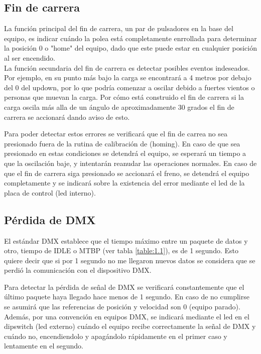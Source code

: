 \subsection{Fin de carrera}
La función principal del fin de carrera, un par de pulsadores en la base del equipo, es indicar cuándo la polea está completamente enrrollada para determinar la posición 0 o "home" del equipo, dado que este puede estar en cualquier posición al ser encendido.\\
La función secundaria del fin de carrera es detectar posibles eventos indeseados. Por ejemplo, en su punto más bajo la carga se encontrará a 4 metros por debajo del 0 del updown, por lo que podría comenzar a oscilar debido a fuertes vientos o personas que muevan la carga. Por cómo está construido el fin de carrera si la carga oscila más alla de un ángulo de aproximadamente 30 grados el fin de carrera se accionará dando aviso de esto.

Para poder detectar estos errores se verificará que el fin de carrea no sea presionado fuera de la rutina de calibración de (homing). En caso de que sea presionado en estas condiciones se detendrá el equipo, se esperará un tiempo a que la oscilación baje, y intentarán reanudar las operaciones normales. En caso de que el fin de carrera siga presionado se accionará el freno, se detendrá el equipo completamente y se indicará sobre la existencia del error mediante el led de la placa de control (led interno).


\subsection{Pérdida de DMX}
El estándar DMX establece que el tiempo máximo entre un paquete de datos y otro, tiempo de IDLE o MTBP (ver tabla \ref{table:1.1}), es de 1 segundo. Esto quiere decir que si por 1 segundo no me llegaron nuevos datos se considera que se perdió la comunicación con el dispositivo DMX.

Para detectar la pérdida de señal de DMX se verificará constantemente que el último paquete haya llegado hace menos de 1 segundo. En caso de no cumplirse se asumirá que las referencias de posición y velocidad son 0 (equipo parado). Además, por una convención en equipos DMX, se indicará mediante el led en el dipswitch (led externo) cuándo el equipo recibe correctamente la señal de DMX y cuándo no, encendiendolo y apagándolo rápidamente en el primer caso y lentamente en el segundo.


